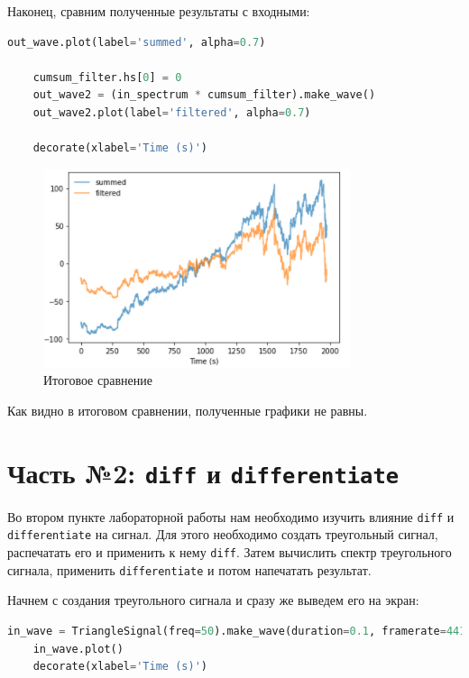 \documentclass[a4paper]{article}
\begin{document}
            Наконец, сравним полученные результаты с входными:
            
\begin{lstlisting}[language=Python, caption= Сравнение вычисленного отношения с фильтром]
    out_wave.plot(label='summed', alpha=0.7)

    cumsum_filter.hs[0] = 0
    out_wave2 = (in_spectrum * cumsum_filter).make_wave()
    out_wave2.plot(label='filtered', alpha=0.7)
    
    decorate(xlabel='Time (s)')
\end{lstlisting}
            
            \begin{figure}[H]
                \centering
                \includegraphics{ex_1_new_result.png}
                \caption{Итоговое сравнение}
                \label{fig:ex_1_new_result}
            \end{figure}
            
            Как видно в итоговом сравнении, полученные графики не равны.
            
    \newpage
        \section{Часть №2: \texttt{diff} и \texttt{differentiate}}
            Во втором пункте лабораторной работы нам необходимо изучить влияние \texttt{diff} и \texttt{differentiate} на сигнал. Для этого необходимо создать треугольный сигнал, распечатать его и применить к нему \texttt{diff}. Затем вычислить спектр треугольного сигнала, применить \texttt{differentiate} и потом напечатать результат. 
            
            Начнем с создания треугольного сигнала и сразу же выведем его на экран:
            
\begin{lstlisting}[language=Python, caption= Создание и вывод треугольного сигнала]
    in_wave = TriangleSignal(freq=50).make_wave(duration=0.1, framerate=44100)
    in_wave.plot()
    decorate(xlabel='Time (s)')
\end{lstlisting}
            
\end{document}
